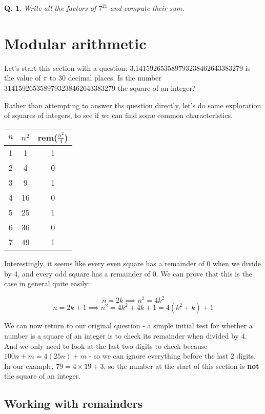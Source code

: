 \documentclass{article}
\newtheorem{question}{Q.}
\begin{document}
\begin{question}Write all the factors of $7^{21}$ and compute their sum.\end{question}
\vspace*{\bigskipamount}

\pagebreak

\section{Modular arithmetic}

Let's start this section with a question: $3.141592653589793238462643383279$ is the
value of $\pi$ to 30 decimal places. Is the number 3141592653589793238462643383279
the square of an integer?

Rather than attempting to answer ths question directly, let's do some exploration
of squares of integers, to see if we can find some common characteristics.

\begin{table}[htb]
\begin{tabular}{|c|c|c|}
\hline
	$n$ & $n^2$ & rem($\frac{n^2}{4}$) \\   
\hline 
	1 &  1 & 1 \\
	2 &  4 & 0 \\
	3 &  9 & 1 \\
	4 & 16 & 0 \\
	5 & 25 & 1 \\
	6 & 36 & 0 \\
	7 & 49 & 1 \\
\hline 
\end{tabular}
\end{table}

Interestingly, it seems like every even square has a remainder of 0 when we divide
by 4, and every odd square has a remainder of 0. We can prove that this is the case
in general quite easily:

\[ n = 2k \implies n^2 = 4k^2 \]
\[ n = 2k+1 \implies n^2 = 4k^2 + 4k + 1 = 4(k^2+k) + 1 \]


We can now return to our original question - a simple initial test for whether a
number is a square of an integer is to check its remainder when divided by 4. And
we only need to look at the last two digits to check because $100n+m =4(25n)+m$ -
so we can ignore everything before the last 2 digits. In our example, 
$79 = 4\times 19 + 3$, so the number at the start of this section is \textbf{not}
the square of an integer.

\subsection{Working with remainders}
\end{document}
